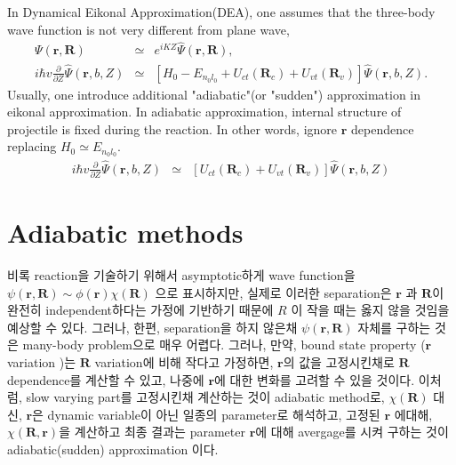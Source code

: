 \documentclass[11pt]{book}
\def\bm{\boldsymbol}
\def\vr{{\bm r}}
\def\vR{{\bm R}}
\newcommand{\bea}{\begin{eqnarray}}
\newcommand{\eea}{\end{eqnarray}}
\newcommand{\no}{\nonumber \\}
\newcommand{\del}{\partial}
\begin{document}
In Dynamical Eikonal Approximation(DEA),  one assumes that the three-body wave function is not very different from plane wave,
\bea 
\Psi(\vr,\vR) &\simeq& e^{iKZ}\hat{\Psi}(\vr,\vR), \no 
i\hbar v \frac{\del }{\del Z} \hat{\Psi}(\vr,b,Z) &\simeq & [ H_0 -E_{n_0l_0}+U_{ct}(\vR_c)+U_{vt}(\vR_{v}) ] \hat{\Psi}(\vr,b,Z).
\eea 
Usually, one introduce additional "adiabatic"(or "sudden") approximation in eikonal approximation. 
In adiabatic approximation, internal structure of projectile is fixed during the reaction.
In other words, ignore $\vr$ dependence replacing $H_0\simeq E_{n_0 l_0}$. 
\bea 
i\hbar v \frac{\del }{\del Z} \hat{\Psi}(\vr,b,Z) &\simeq & [ U_{ct}(\vR_c)+U_{vt}(\vR_{v}) ] \hat{\Psi}(\vr,b,Z)
\eea   


\section{Adiabatic methods} 
비록 reaction을 기술하기 위해서 asymptotic하게 wave function을 
$\psi({\bm r},{\bm R})\sim \phi(\vr)\chi({\bm R})$ 으로 표시하지만, 
실제로 이러한 separation은 $\vr$ 과 $\vR$이 완전히 independent하다는 
가정에 기반하기 때문에 $R$ 이 작을 때는 옳지 않을 것임을 예상할 수 있다. 
그러나, 한편, separation을 하지 않은채 $\psi({\bm r},{\bm R})$ 자체를 구하는 것은
many-body problem으로 매우 어렵다. 그러나, 만약, bound state property
($\vr$ variation )는 ${\bm R}$ variation에 비해 작다고 가정하면, 
$\vr$의 값을 고정시킨채로 $\vR$ dependence를 계산할 수 있고, 나중에 $\vr$에 대한 
변화를 고려할 수 있을 것이다. 이처럼, slow varying part를 고정시킨채 계산하는 것이
adiabatic method로, $\chi(\vR)$ 대신, 
$\vr$은 dynamic variable이 아닌 일종의 parameter로 해석하고,
고정된 $\vr$ 에대해, $\chi(\vR,\vr)$을 
계산하고 최종 결과는 parameter $\vr$에 대해 avergage를 시켜 구하는 것이 adiabatic(sudden) approximation
이다.  
\end{document}
